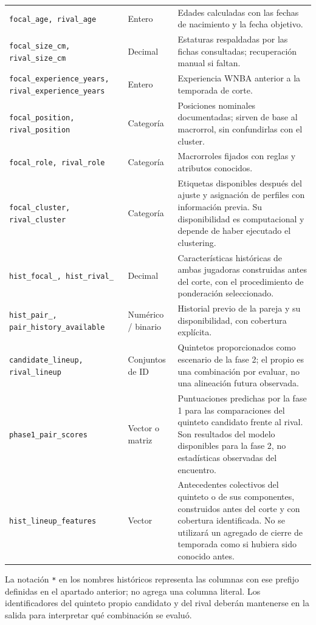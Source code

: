 \begin{longtable}{@{}>{\raggedright\arraybackslash}p{5.0cm}>{\raggedright\arraybackslash}p{1.9cm}>{\raggedright\arraybackslash}p{7.7cm}@{}}
\texttt{focal\_\allowbreak age, rival\_\allowbreak age} & Entero & Edades calculadas con las fechas de nacimiento y la fecha objetivo.\\
\texttt{focal\_\allowbreak size\_\allowbreak cm, rival\_\allowbreak size\_\allowbreak cm} & Decimal & Estaturas respaldadas por las fichas consultadas; recuperación manual si faltan.\\
\texttt{focal\_\allowbreak experience\_\allowbreak years, rival\_\allowbreak experience\_\allowbreak years} & Entero & Experiencia WNBA anterior a la temporada de corte.\\
\texttt{focal\_\allowbreak position, rival\_\allowbreak position} & Categoría & Posiciones nominales documentadas; sirven de base al macrorrol, sin confundirlas con el cluster.\\
\texttt{focal\_\allowbreak role, rival\_\allowbreak role} & Categoría & Macrorroles fijados con reglas y atributos conocidos.\\
\texttt{focal\_\allowbreak cluster, rival\_\allowbreak cluster} & Categoría & Etiquetas disponibles después del ajuste y asignación de perfiles con información previa. Su disponibilidad es computacional y depende de haber ejecutado el clustering.\\
\texttt{hist\_\allowbreak focal\_\allowbreak *, hist\_\allowbreak rival\_\allowbreak *} & Decimal & Características históricas de ambas jugadoras construidas antes del corte, con el procedimiento de ponderación seleccionado.\\
\texttt{hist\_\allowbreak pair\_\allowbreak *, pair\_\allowbreak history\_\allowbreak available} & Numérico / binario & Historial previo de la pareja y su disponibilidad, con cobertura explícita.\\
\texttt{candidate\_\allowbreak lineup, rival\_\allowbreak lineup} & Conjuntos de ID & Quintetos proporcionados como escenario de la fase 2; el propio es una combinación por evaluar, no una alineación futura observada.\\
\texttt{phase1\_\allowbreak pair\_\allowbreak scores} & Vector o matriz & Puntuaciones predichas por la fase 1 para las comparaciones del quinteto candidato frente al rival. Son resultados del modelo disponibles para la fase 2, no estadísticas observadas del encuentro.\\
\texttt{hist\_\allowbreak lineup\_\allowbreak features} & Vector & Antecedentes colectivos del quinteto o de sus componentes, construidos antes del corte y con cobertura identificada. No se utilizará un agregado de cierre de temporada como si hubiera sido conocido antes.\\
\end{longtable}
\endgroup
La notación \texttt{*} en los nombres históricos representa las columnas con ese prefijo definidas en el apartado anterior; no agrega una columna literal. Los identificadores del quinteto propio candidato y del rival deberán mantenerse en la salida para interpretar qué combinación se evaluó.

